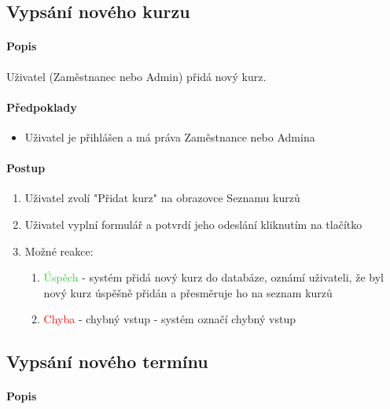 \documentclass[12pt,a4paper,titlepage,final]{report}
\begin{document}

\subsection{Vypsání nového kurzu}

\paragraph{Popis}

Uživatel (Zaměstnanec nebo Admin) přidá nový kurz.

\paragraph{Předpoklady}

\begin{itemize}
	\item Uživatel je přihlášen a má práva Zaměstnance nebo Admina
\end{itemize}

\paragraph{Postup}

\begin{enumerate}
	\item Uživatel zvolí "Přidat kurz" na obrazovce Seznamu kurzů
	\item Uživatel vyplní formulář a potvrdí jeho odeslání kliknutím na tlačítko
	\item Možné reakce:
	\begin{enumerate}
		\item \textcolor{LimeGreen}{Úspěch} - systém přidá nový kurz do databáze, oznámí uživateli, že byl nový kurz úspěšně přidán a přesměruje ho na seznam kurzů
		\item \textcolor{Red}{Chyba} - chybný vstup - systém označí chybný vstup
	\end{enumerate}	
\end{enumerate}



\subsection{Vypsání nového termínu}

\paragraph{Popis}
\end{document}
